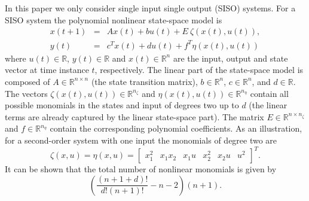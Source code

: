 \documentclass[review]{elsarticle}
\begin{document}
In this paper we only consider single input single output (SISO) systems. For a SISO system the polynomial nonlinear state-space model is
\begin{eqnarray}
x(t+1) &=& A x(t)  + b u(t) + E \ \zeta (x(t),u(t)), \nonumber \\
y(t)&=& \! \!  c^T x(t) + d u(t)+f^T \eta (x(t),u(t)) \label{eq:FullPNLSS}
\end{eqnarray}
where $u(t) \in \mathbb{R}$, $y(t) \in \mathbb{R}$ and $x(t) \in \mathbb{R}^n$ are the input, output and state vector at time instance $t$, respectively. The linear part of the state-space model is composed of $A \in \mathbb{R}^{n \times n}$ (the state transition matrix), $b \in \mathbb{R}^{n}$, $c \in \mathbb{R}^{n}$, and $d \in \mathbb{R}$.
The vectors $\zeta(x(t),u(t)) \in \mathbb{R}^{n_\zeta}$ and $\eta(x(t),u(t)) \in \mathbb{R}^{n_\eta}$ contain all possible monomials in the states and input of degrees two up to $d$ (the linear terms are already captured by the linear state-space part).
The matrix $E \in \mathbb{R}^{n \times n_{\zeta}}$ and $f \in \mathbb{R}^{n_{\eta}}$ contain the corresponding polynomial coefficients.
As an illustration, for a second-order system with one input the monomials of
degree two are
\begin{equation}
 \zeta(x,u) =
 \eta(x,u)=
\begin{bmatrix} x_1^2 & x_1 x_2 & x_1 u & x_2^2 & x_2 u & u^2 \end{bmatrix}^T. 
\end{equation}
It can be shown that the total number of nonlinear monomials is given by \citep{Paduart1}
\begin{equation}
\left(
\frac{(n+1+d)!}{d!(n+1)!}-n-2
\right)
(n+1).
\label{eq:Comb}
\end{equation}
\end{document}
